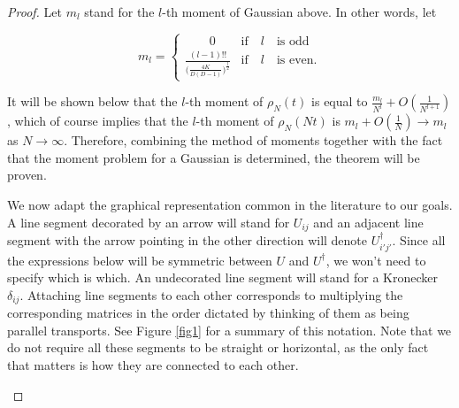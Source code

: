 \documentclass[twoside, a4paper,10pt]{article}
\newcommand{\ben}{\begin{equation*}}
\newcommand{\een}{\end{equation*}}
\newcommand{\txt}{\textrm}
\begin{document}
\begin{proof}
Let $m_l$ stand for the $l$-th moment of Gaussian above. In other words, let

\ben
m_l = 
\begin{cases}
\quad \quad 0 & \text{if} \quad  l \quad  \text{is odd}\\
 \frac{(l-1)!!}{  \big (  \frac{4 K }{D (D-1)}  \big )^{\frac{l}{2}} }  & \text{if}  \quad l  \quad \text{is even}.
\end{cases}
\een

It will be shown below that the $l$-th moment of $\rho_N(t)$ is equal to $\frac{m_l}{N^l} + O(\frac{1}{N^{l+1}})$, which of course implies that the $l$-th moment of $\rho_N(Nt)$ is $m_l + O(\frac{1}{N}) \to m_l$ as $N \to \infty$. Therefore, combining the method of moments together with the fact that the moment problem for a Gaussian is determined, the theorem will be proven. \newline

We now adapt the graphical representation common in the literature \cite{creutz} to our goals. A line segment decorated by an arrow will stand for $U_{ij}$ and an adjacent line segment with the arrow pointing in the other direction will denote $U^\dagger_{i'j'}$. Since all the expressions below will be symmetric between $U$ and $U^\dagger$, we won't need to specify which is which. An undecorated line segment will stand for a Kronecker $\delta_{ij}$. Attaching line segments to each other corresponds to multiplying the corresponding matrices in the order dictated by thinking of them as being parallel transports. See Figure \ref{fig1} for a summary of this notation. Note that we do not require all these segments to be straight or horizontal, as the only fact that matters is how they are connected to each other. \newline



\begin{figure}[h]
\end{figure}
\end{proof}
\end{document}
